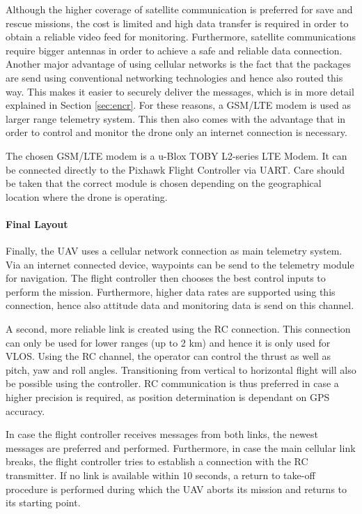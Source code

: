Although the higher coverage of satellite communication is preferred for save and rescue missions, the cost is limited and high data transfer is required in order to obtain a reliable video feed for monitoring. Furthermore, satellite communications require bigger antennas in order to achieve a safe and reliable data connection. Another major advantage of using cellular networks is the fact that the packages are send using conventional networking technologies and hence also routed this way. This makes it easier to securely deliver the messages, which is in more detail explained in Section \ref{sec:encr}. For these reasons, a GSM/LTE modem is used as larger range telemetry system. This then also comes with the advantage that in order to control and monitor the drone only an internet connection is necessary.

The chosen GSM/LTE modem is a u-Blox TOBY L2-series LTE Modem. It can be connected directly to the Pixhawk Flight Controller via UART. Care should be taken that the correct module is chosen depending on the geographical location where the drone is operating. 

\paragraph{Final Layout}

Finally, the UAV uses a cellular network connection as main telemetry system. Via an internet connected device, waypoints can be send to the telemetry module for navigation. The flight controller then chooses the best control inputs to perform the mission. Furthermore, higher data rates are supported using this connection, hence also attitude data and monitoring data is send on this channel.

A second, more reliable link is created using the RC connection. This connection can only be used for lower ranges (up to 2 km) and hence it is only used for VLOS. Using the RC channel, the operator can control the thrust as well as pitch, yaw and roll angles. Transitioning from vertical to horizontal flight will also be possible using the controller. RC communication is thus preferred in case a higher precision is required, as position determination is dependant on GPS accuracy. 

In case the flight controller receives messages from both links, the newest messages are preferred and performed. Furthermore, in case the main cellular link breaks, the flight controller tries to establish a connection with the RC transmitter. If no link is available within 10 seconds, a return to take-off procedure is performed during which the UAV aborts its mission and returns to its starting point. 






